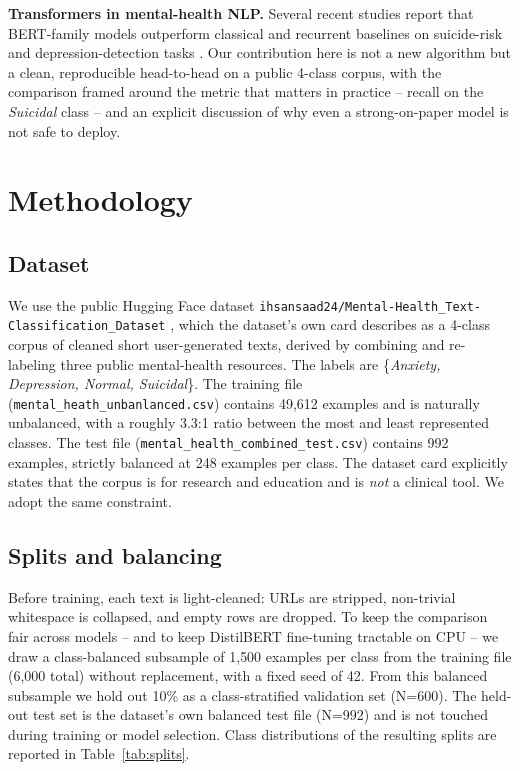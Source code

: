 \documentclass[12pt]{article}
\begin{document}
\textbf{Transformers in mental-health NLP.} Several recent studies
report that BERT-family models outperform classical and recurrent
baselines on suicide-risk and depression-detection tasks
\cite{matero2019, jiang2020}. Our contribution here is not a new
algorithm but a clean, reproducible head-to-head on a public 4-class
corpus, with the comparison framed around the metric that matters in
practice -- recall on the \textit{Suicidal} class -- and an explicit
discussion of why even a strong-on-paper model is not safe to deploy.

\section{Methodology}

\subsection{Dataset}

We use the public Hugging Face dataset
\texttt{ihsansaad24/Mental-Health\_Text-Classification\_Dataset}
\cite{ihsansaad2024mhdataset}, which the dataset's own card describes
as a 4-class corpus of cleaned short user-generated texts, derived by
combining and re-labeling three public mental-health resources. The
labels are \{\textit{Anxiety, Depression, Normal, Suicidal}\}. The
training file (\texttt{mental\_heath\_unbanlanced.csv}) contains
49{,}612 examples and is naturally unbalanced, with a roughly 3.3:1
ratio between the most and least represented classes. The test file
(\texttt{mental\_health\_combined\_test.csv}) contains 992 examples,
strictly balanced at 248 examples per class. The dataset card
explicitly states that the corpus is for research and education and
is \emph{not} a clinical tool. We adopt the same constraint.

\subsection{Splits and balancing}

Before training, each text is light-cleaned: URLs are stripped,
non-trivial whitespace is collapsed, and empty rows are dropped. To
keep the comparison fair across models -- and to keep DistilBERT
fine-tuning tractable on CPU -- we draw a class-balanced subsample of
1{,}500 examples per class from the training file (6{,}000 total)
without replacement, with a fixed seed of 42. From this balanced
subsample we hold out 10\% as a class-stratified validation set
(N=600). The held-out test set is the dataset's own balanced test
file (N=992) and is not touched during training or model selection.
Class distributions of the resulting splits are reported in
Table~\ref{tab:splits}.
\end{document}
